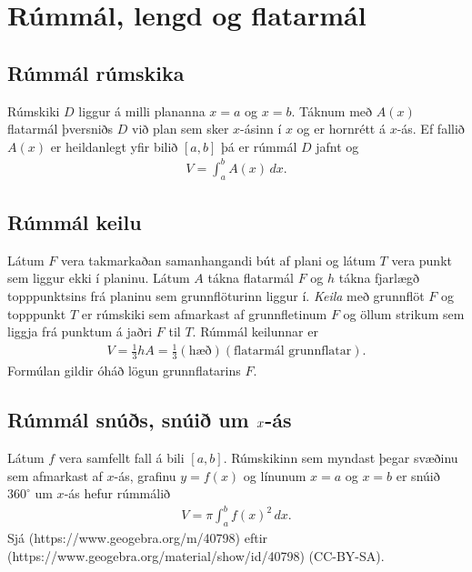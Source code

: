\documentclass[a4paper,10pt,icelandic]{sphinxmanual}
\begin{document}

\section{Rúmmál, lengd og flatarmál}
\label{\detokenize{kafli07:index-1}}\label{\detokenize{kafli07:rummal-lengd-og-flatarmal}}

\subsection{Rúmmál rúmskika}
\label{\detokenize{kafli07:rummal-rumskika}}
Rúmskiki \(D\) liggur á milli plananna \(x=a\) og \(x=b\).
Táknum með \(A(x)\) flatarmál þversniðs \(D\) við plan sem sker
\(x\)-ásinn í \(x\) og er hornrétt á \(x\)-ás. Ef fallið
\(A(x)\) er heildanlegt yfir bilið \([a, b]\) þá er rúmmál
\(D\) jafnt og
\begin{equation*}
\begin{split}V=\int_a^b A(x)\,dx.\end{split}
\end{equation*}

\subsection{Rúmmál keilu}
\label{\detokenize{kafli07:index-2}}\label{\detokenize{kafli07:rummal-keilu}}
Látum \(F\) vera takmarkaðan samanhangandi bút af plani og látum
\(T\) vera punkt sem liggur ekki í planinu. Látum \(A\) tákna
flatarmál \(F\) og \(h\) tákna fjarlægð topppunktsins frá
planinu sem grunnflöturinn liggur í. \textit{Keila} með grunnflöt \(F\) og
topppunkt \(T\) er rúmskiki sem afmarkast af grunnfletinum \(F\)
og öllum strikum sem liggja frá punktum á jaðri \(F\) til \(T\).
Rúmmál keilunnar er
\begin{equation*}
\begin{split}V=\frac{1}{3}hA=\frac{1}{3}(\mbox{hæð})(\mbox{flatarmál
grunnflatar}).\end{split}
\end{equation*}
Formúlan gildir óháð lögun grunnflatarins \(F\).


\subsection{Rúmmál snúðs, snúið um \protect\(x\protect\)-ás}
\label{\detokenize{kafli07:index-3}}\label{\detokenize{kafli07:rummal-snus-snui-um-as}}
Látum \(f\) vera samfellt fall á bili \([a, b]\). Rúmskikinn sem
myndast þegar svæðinu sem afmarkast af \(x\)-ás, grafinu
\(y=f(x)\) og línunum \(x=a\) og \(x=b\) er snúið
\(360^\circ\) um \(x\)-ás hefur rúmmálið
\begin{equation*}
\begin{split}V=\pi\int_a^b f(x)^2\,dx.\end{split}
\end{equation*}
Sjá   (https://www.geogebra.org/m/40798)
eftir  (https://www.geogebra.org/material/show/id/40798) (CC-BY-SA).
\end{document}
